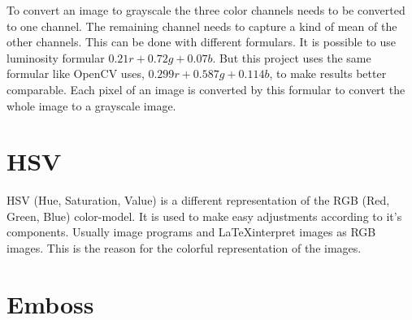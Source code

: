 \noindent
To convert an image to grayscale the three color channels needs to be converted to one channel. The remaining channel needs to capture a kind of mean of the other channels. This can be done with different formulars. It is possible to use luminosity formular $ 0.21r + 0.72g + 0.07b $. But this project uses the same formular like OpenCV uses, $ 0.299r + 0.587g + 0.114b $, to make results better comparable. Each pixel of an image is converted by this formular to convert the whole image to a grayscale image.

\section{HSV}

\noindent
HSV (Hue, Saturation, Value) is a different representation of the RGB (Red, Green, Blue) color-model. It is used to make easy adjustments according to it's components. Usually image programs and \LaTeX \space interpret images as RGB images. This is the reason for the colorful representation of the images.

\section{Emboss}